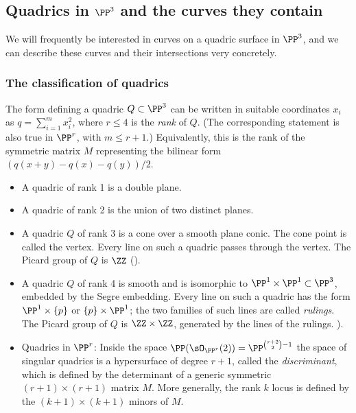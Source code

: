 \subsection{Quadrics in $\PP^3$ and the curves they contain}\label{Div of quadric}
 
 We will frequently be interested in curves on a quadric surface in $\PP^3$, and we can describe these
curves and their intersections very concretely.

\subsubsection{The classification of quadrics} The form defining a quadric $Q\subset \PP^{3}$ can be written in suitable
coordinates $x_{i}$ as $q = \sum_{i=1}^{m} x_{i}^{2}$, where $r\leq 4$ is the \emph{rank} of $Q$. (The corresponding
statement is also true in $\PP^{r}$, with $m\leq r+1$.) Equivalently, this is the rank of the symmetric matrix $M$
representing the bilinear form $(q(x+y)-q(x)-q(y))/2$.

\begin{itemize}
\item A quadric of rank 1 is a double plane.
\item A quadric of rank 2 is the union of two distinct planes. 
\item A quadric $Q$ of rank 3 is a cone over a smooth plane conic. The cone point is called the vertex. Every line
on such a quadric passes through the vertex. The Picard group of $Q$ is $\ZZ$
(\cite[Exercise II.6.5]{Hartshorne1977}).
\item A quadric $Q$ of rank 4 is smooth and is isomorphic to $\PP^{1}\times \PP^{1} \subset \PP^{3}$, embedded by the Segre embedding. Every line on such a quadric has the form $\PP^{1}\times \{p\}$ or $\{p\} \times \PP^{1}$; the two families of such lines are called \emph{rulings}.
The Picard group of $Q$ is $\ZZ\times \ZZ$, generated by the lines of the rulings.
\cite[Example II.6.1]{Hartshorne1977}).

\item Quadrics in $\PP^{r}$: Inside the space $\PP(\sO_{\PP^{r}}(2)) = \PP^{\binom{r+2}{2}-1}$ the space
of singular quadrics is a hypersurface of degree $r+1$, called the \emph{discriminant}, which is defined by the determinant of a generic symmetric
$(r+1)\times (r+1)$ matrix $M$. More generally, the rank $k$ locus is defined by the $(k+1)\times (k+1)$
minors of $M$.
\end{itemize}

